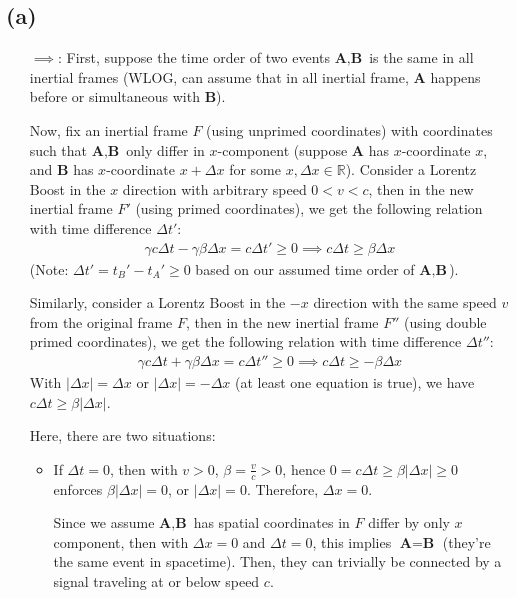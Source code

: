 \documentclass{article}
\newcommand{\RR}{\mathbb{R}}
\newcommand{\bA}{\textbf{A}}
\newcommand{\bB}{\textbf{B}}
\begin{document}
\subsection*{(a)}
\begin{itemize}
    \item[$\implies$:] First, suppose the time order of two events $\bA, \bB$ is the same in all inertial frames (WLOG, can assume that in all inertial frame, $\bA$ happens before or simultaneous with $\bB$). 
    
    Now, fix an inertial frame $F$ (using unprimed coordinates) with coordinates such that $\bA,\bB$ only differ in $x$-component (suppose $\bA$ has $x$-coordinate $x$, and $\bB$ has $x$-coordinate $x+\Delta x$ for some $x,\Delta x\in\RR$). 
    Consider a Lorentz Boost in the $x$ direction with arbitrary speed $0< v<c$, then in the new inertial frame $F'$ (using primed coordinates), we get the following relation with time difference $\Delta t'$:
    \begin{align}
         \gamma c\Delta t-\gamma\beta \Delta x =c\Delta t'\geq 0\implies c\Delta t \geq \beta \Delta x
    \end{align}
    (Note: $\Delta t' = t_B' - t_A' \geq 0$ based on our assumed time order of $\bA,\bB$).

    Similarly, consider a Lorentz Boost in the $-x$ direction with the same speed $v$ from the original frame $F$, then in the new inertial frame $F''$ (using double primed coordinates), we get the following relation with time difference $\Delta t''$:
    \begin{align}
        \gamma c\Delta t + \gamma\beta \Delta x = c\Delta t'' \geq 0\implies c\Delta t \geq -\beta \Delta x
    \end{align}
    With $|\Delta x| = \Delta x$ or $|\Delta x| = -\Delta x$ (at least one equation is true), we have $c\Delta t\geq \beta |\Delta x|$.

    Here, there are two situations:
    \begin{itemize}
        \item If $\Delta t=0$, then with $v>0$, $\beta =\frac{v}{c}>0$, hence $0=c\Delta t \geq \beta |\Delta x|\geq 0$ enforces $\beta |\Delta x|=0$, or $|\Delta x|=0$. Therefore, $\Delta x = 0$.
        
        Since we assume $\bA,\bB$ has spatial coordinates in $F$ differ by only $x$ component, then with $\Delta x=0$ and $\Delta t=0$, this implies $\bA=\bB$ (they're the same event in spacetime). Then, they can trivially be connected by a signal traveling at or below speed $c$.


\end{itemize}
\end{itemize}
\end{document}
